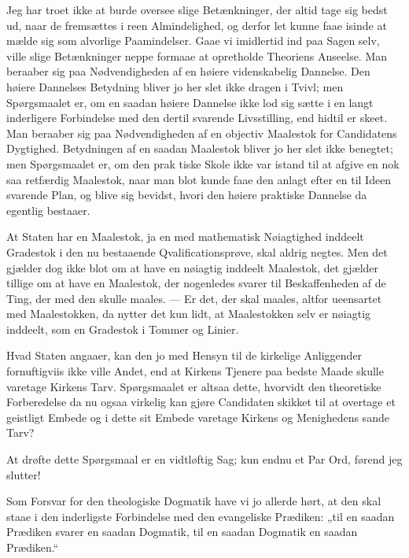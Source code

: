 \documentclass[12pt,a4paper]{book}
\newcommand{\opage}[1]{\marginnote{\footnotesize\textit{[#1]}}}
\begin{document}
Jeg har troet ikke at burde oversee slige Betænkninger, der altid tage sig
bedst ud, naar de fremsættes i reen Almindelighed, og derfor let kunne faae
isinde at mælde sig som alvorlige Paamindelser. Gaae vi imidlertid ind paa
Sagen selv, ville slige Betænkninger neppe formaae at opretholde Theoriens
Anseelse. Man beraaber sig paa Nødvendigheden af en høiere videnskabelig
Dannelse. Den høiere Dannelses Betydning bliver jo her slet ikke dragen i
Tvivl; men Spørgsmaalet er, om en saadan høiere Dannelse ikke lod sig sætte
i en langt inderligere Forbindelse med den dertil svarende Livsstilling,
end hidtil er skeet. Man beraaber sig paa Nødvendigheden af en objectiv
Maalestok for Candidatens Dygtighed. Betydningen af en saadan Maalestok
bliver jo her slet ikke benegtet; men Spørgsmaalet er, om den prak\-%
\opage{141}tiske Skole ikke var istand til at afgive en nok saa retfærdig Maalestok,
naar man blot kunde faae den anlagt efter en til Ideen svarende Plan, og
blive sig bevidst, hvori den høiere praktiske Dannelse da egentlig bestaaer.

At Staten har en Maalestok, ja en med mathematisk Nøiagtighed inddeelt
Gradestok i den nu bestaaende Qvalificationsprøve, skal aldrig negtes. Men
det gjælder dog ikke blot om at have en nøiagtig inddeelt Maalestok, det
gjælder tillige om at have en Maalestok, der nogenledes svarer til
Beskaffenheden af de Ting, der med den skulle maales. --- Er det, der skal
maales, altfor ueensartet med Maalestokken, da nytter det kun lidt, at
Maalestokken selv er nøiagtig inddeelt, som en Gradestok i Tommer og
Linier.

Hvad Staten angaaer, kan den jo med Hensyn til de kirkelige Anliggender
fornuftigviis ikke ville Andet, end at Kirkens Tjenere paa bedste Maade
skulle varetage Kirkens Tarv. Spørgsmaalet er altsaa dette, hvorvidt den
theoretiske Forberedelse da nu ogsaa virkelig kan gjøre Candidaten skikket
til at overtage et geistligt Embede og i dette sit Embede varetage Kirkens
og Menighedens sande Tarv?

At drøfte dette Spørgsmaal er en vidtløftig Sag; kun endnu et Par Ord,
førend jeg slutter!

Som Forsvar for den theologiske Dogmatik have vi jo allerde hørt, at den
skal staae i den inderligste Forbindelse med den evangeliske Prædiken: „til
en saadan Prædiken svarer en saadan Dogmatik, til en saadan Dogmatik en
saadan Prædiken.“
\end{document}
